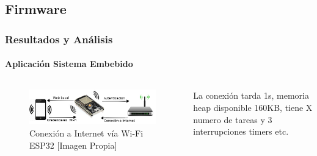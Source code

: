 \subsection{Firmware}
\begin{frame}
\frametitle{Resultados y Análisis}
\framesubtitle{Aplicación Sistema Embebido}
\begin{columns}
\begin{figure}
	\centering
	\caption{Conexión a Internet vía Wi-Fi ESP32 [Imagen Propia]}
	\label{fig:conexion}
	\includegraphics[width=\linewidth]{Imagenes/conexion}
\end{figure}
	
	La conexión tarda 1s, memoria heap disponible 160KB, tiene X numero de tareas y 3 interrupciones timers etc.
	
\end{columns}
\end{frame}

